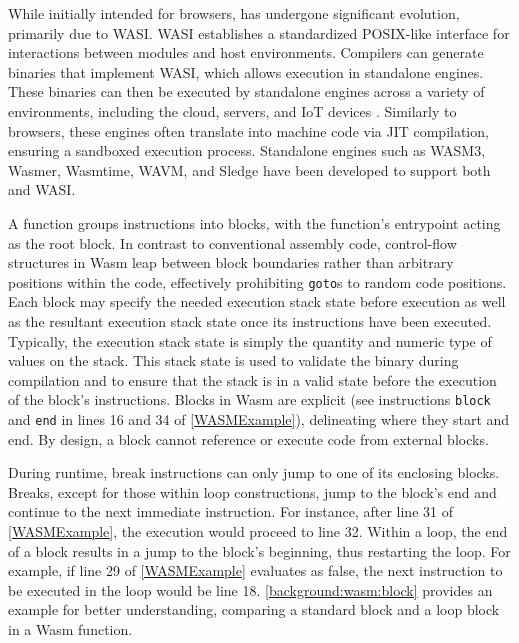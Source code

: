 While initially intended for browsers, \Wasm has undergone significant evolution, primarily due to WASI\cite{WASI}.
WASI establishes a standardized POSIX-like interface for interactions between \Wasm modules and host environments.
Compilers can generate \Wasm binaries that implement WASI, which allows execution in standalone engines.
These binaries can then be executed by standalone engines across a variety of environments, including the cloud, servers, and IoT devices \cite{makitalo2021webassembly, 2023arXiv230513241T}.
Similarly to browsers, these engines often translate \Wasm into machine code via JIT compilation, ensuring a sandboxed execution process.
Standalone engines such as WASM3, Wasmer, Wasmtime, WAVM, and Sledge\cite{Sledge} have been developed to support both \Wasm and WASI.


\label{wasm:control_flow}


A \Wasm function groups instructions into blocks, with the function's entrypoint acting as the root block. 
In contrast to conventional assembly code, control-flow structures in Wasm leap between block boundaries rather than arbitrary positions within the code, effectively prohibiting \texttt{goto}s to random code positions. 
Each block may specify the needed execution stack state before execution as well as the resultant execution stack state once its instructions have been executed.
Typically, the execution stack state is simply the quantity and numeric type of values on the stack. 
This stack state is used to validate the binary during compilation and to ensure that the stack is in a valid state before the execution of the block's instructions.
Blocks in Wasm are explicit (see instructions \texttt{block} and \texttt{end} in lines 16 and 34 of \autoref{WASMExample}), delineating where they start and end.
By design, a block cannot reference or execute code from external blocks.


During runtime, \Wasm break instructions can only jump to one of its enclosing blocks. 
Breaks, except for those within loop constructions, jump to the block's end and continue to the next immediate instruction. 
For instance, after line 31 of \autoref{WASMExample}, the execution would proceed to line 32. 
Within a loop, the end of a block results in a jump to the block's beginning, thus restarting the loop. 
For example, if line 29 of \autoref{WASMExample} evaluates as false, the next instruction to be executed in the loop would be line 18. 
\autoref{background:wasm:block} provides an example for better understanding, comparing a standard block and a loop block in a Wasm function.

